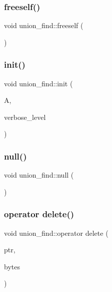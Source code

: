 \mbox{\label{classunion__find_affeea0e4bdd8536f6fde8a52d19b5214}} 
\subsubsection{\texorpdfstring{freeself()}{freeself()}}
{\footnotesize\ttfamily void union\+\_\+find\+::freeself (\begin{DoxyParamCaption}{ }\end{DoxyParamCaption})}

\mbox{\label{classunion__find_aa5570ce2160988e7ea7de8b2b8756f70}} 
\subsubsection{\texorpdfstring{init()}{init()}}
{\footnotesize\ttfamily void union\+\_\+find\+::init (\begin{DoxyParamCaption}\item[{\mbox{\hyperlink{classaction}{action}} $\ast$}]{A,  }\item[{\mbox{\hyperlink{galois_8h_a09fddde158a3a20bd2dcadb609de11dc}{I\+NT}}}]{verbose\+\_\+level }\end{DoxyParamCaption})}

\mbox{\label{classunion__find_a465f199e41e130e6de65c429cda3cb18}} 
\subsubsection{\texorpdfstring{null()}{null()}}
{\footnotesize\ttfamily void union\+\_\+find\+::null (\begin{DoxyParamCaption}{ }\end{DoxyParamCaption})}

\mbox{\label{classunion__find_ab3e80756b80b3dc843f67023da85bd50}} 
\subsubsection{\texorpdfstring{operator delete()}{operator delete()}}
{\footnotesize\ttfamily void union\+\_\+find\+::operator delete (\begin{DoxyParamCaption}\item[{void $\ast$}]{ptr,  }\item[{size\+\_\+t}]{bytes }\end{DoxyParamCaption})}


